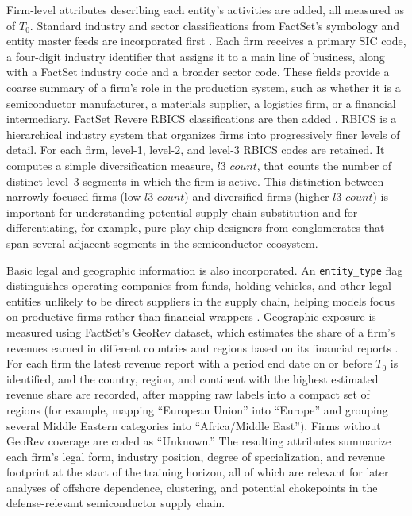 Firm-level attributes describing each entity's activities are added, all measured as of \(T_0\). Standard industry and sector classifications from FactSet's symbology and entity master feeds are incorporated first \parencite{factset_standard_2025, factset_factset_2025}. Each firm receives a primary SIC code, a four-digit industry identifier that assigns it to a main line of business, along with a FactSet industry code and a broader sector code. These fields provide a coarse summary of a firm's role in the production system, such as whether it is a semiconductor manufacturer, a materials supplier, a logistics firm, or a financial intermediary. FactSet Revere RBICS classifications are then added \parencite{factset_standard_2021, factset_factset_2025}. RBICS is a hierarchical industry system that organizes firms into progressively finer levels of detail. For each firm, level-1, level-2, and level-3 RBICS codes are retained. It computes a simple diversification measure, \(l3\_count\), that counts the number of distinct level~3 segments in which the firm is active. This distinction between narrowly focused firms (low \(l3\_count\)) and diversified firms (higher \(l3\_count\)) is important for understanding potential supply-chain substitution and for differentiating, for example, pure-play chip designers from conglomerates that span several adjacent segments in the semiconductor ecosystem.

Basic legal and geographic information is also incorporated. An \texttt{entity\_type} flag distinguishes operating companies from funds, holding vehicles, and other legal entities unlikely to be direct suppliers in the supply chain, helping models focus on productive firms rather than financial wrappers \parencite{factset_factset_2025}. Geographic exposure is measured using FactSet's GeoRev dataset, which estimates the share of a firm's revenues earned in different countries and regions based on its financial reports \parencite{factset_geographic_2025, factset_standard_2024}. For each firm the latest revenue report with a period end date on or before \(T_0\) is identified, and the country, region, and continent with the highest estimated revenue share are recorded, after mapping raw labels into a compact set of regions (for example, mapping ``European Union'' into ``Europe'' and grouping several Middle Eastern categories into ``Africa/Middle East''). Firms without GeoRev coverage are coded as ``Unknown.'' The resulting attributes summarize each firm's legal form, industry position, degree of specialization, and revenue footprint at the start of the training horizon, all of which are relevant for later analyses of offshore dependence, clustering, and potential chokepoints in the defense-relevant semiconductor supply chain.

